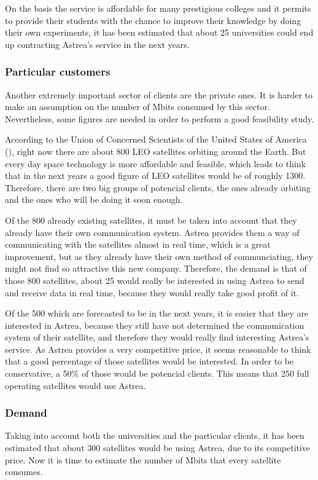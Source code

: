 On the basis the service is affordable for many prestigious colleges and it permits to provide their students with the chance to improve their knowledge by doing their own experiments, it has been estimated that about 25 universities could end up contracting Astrea's service in the next years.

\subsubsection{Particular customers}
Another extremely important sector of clients are the private ones. It is harder to make an assumption on the number of Mbits consumed by this sector. Nevertheless, some figures are needed in order to perform a good feasibility study. 

According to the Union of Concerned Scientists of the United States of America (\cite{UCSUSA}), right now there are about 800 LEO satellites orbiting around the Earth. But every day space technology is more affordable and feasible, which leads to think that in the next years a good figure of LEO satellites would be of roughly 1300. Therefore, there are two big groups of potencial clients, the ones already orbiting and the ones who will be doing it soon enough.

Of the 800 already existing satellites, it must be taken into account that they already have their own communication system. Astrea provides them a way of communicating with the satellites almost in real time, which is a great improvement, but as they already have their own method of communciating, they might not find so attractive this new company. Therefore, the demand is that of those 800 satellites, about 25 would really be interested in using Astrea to send and receive data in real time, because they would really take good profit of it.

Of the 500 which are forecasted to be in the next years, it is easier that they are interested in Astrea, because they still have not determined the communication system of their satellite, and therefore they would really find interesting Astrea's service. As Astrea provides a very competitive price, it seems reasonable to think that a good percentage of those satellites would be interested. In order to be conservative, a 50\% of those would be potencial clients. This means that 250 full operating satellites would use Astrea.

\subsubsection{Demand}
Taking into account both the universities and the particular clients, it has been estimated that about 300 satellites would be using Astrea, due to its competitive price. Now it is time to estimate the number of Mbits that every satellite consumes.

